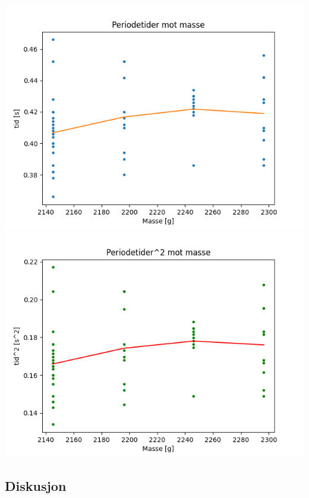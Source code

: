 \begin{center}

\includegraphics[scale = 0.45]{Figurer/Lab_2_Masse_Mot_Periode.png}
\includegraphics[scale = 0.45]{Figurer/Lab_2_Masse_Mot_Periode2.png}

\label{MassePeriode}
    
\end{center}

\subsection{Diskusjon}

